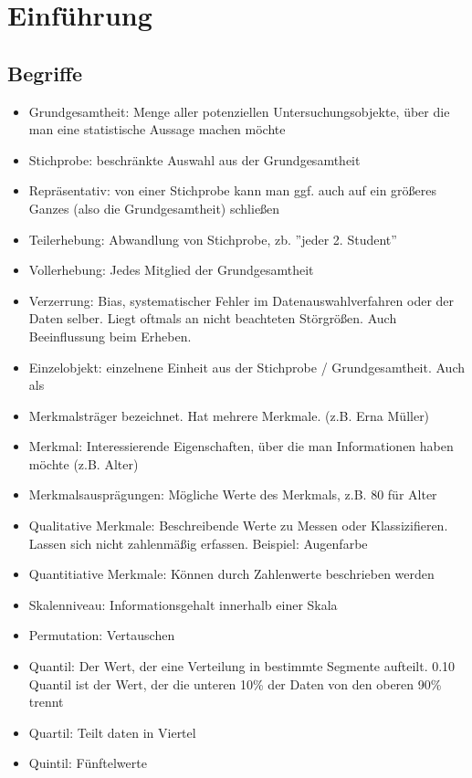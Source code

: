 \section{Einführung}
\subsection{Begriffe}
\begin{itemize}
  \item Grundgesamtheit: Menge aller potenziellen Untersuchungsobjekte, über die man eine statistische Aussage machen möchte
  \item Stichprobe: beschränkte Auswahl aus der Grundgesamtheit
  \item Repräsentativ: von einer Stichprobe kann man ggf. auch auf ein größeres Ganzes (also die Grundgesamtheit) schließen
  \item Teilerhebung: Abwandlung von Stichprobe, zb. ''jeder 2. Student''
  \item Vollerhebung: Jedes Mitglied der Grundgesamtheit
  \item Verzerrung: Bias, systematischer Fehler im Datenauswahlverfahren oder der Daten selber. Liegt oftmals an nicht beachteten Störgrößen. Auch Beeinflussung beim Erheben.
  \item Einzelobjekt: einzelnene Einheit aus der Stichprobe / Grundgesamtheit. Auch als \item Merkmalsträger bezeichnet. Hat mehrere Merkmale. (z.B. Erna Müller)
  \item Merkmal: Interessierende Eigenschaften, über die man Informationen haben möchte (z.B. Alter)
  \item Merkmalsausprägungen: Mögliche Werte des Merkmals, z.B. 80 für Alter
  \item Qualitative Merkmale: Beschreibende Werte zu Messen oder Klassizifieren. Lassen sich nicht zahlenmäßig erfassen. Beispiel: Augenfarbe
  \item Quantitiative Merkmale: Können durch Zahlenwerte beschrieben werden
  \item Skalenniveau: Informationsgehalt innerhalb einer Skala
  \item Permutation: Vertauschen
  \item Quantil: Der Wert, der eine Verteilung in bestimmte Segmente aufteilt.
0.10 Quantil ist der Wert, der die unteren 10\% der Daten von den oberen 90\% trennt
    \item Quartil: Teilt daten in Viertel
   \item Quintil: Fünftelwerte	
\end{itemize}

